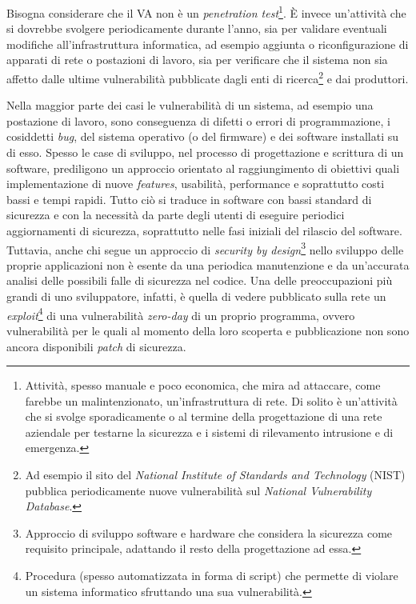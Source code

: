 \documentclass[target=bach,aauheader=]{thud}
\begin{document}
Bisogna considerare che il VA non è un \textit{penetration test}\footnote{Attività, spesso manuale e poco economica, che mira ad attaccare, come farebbe un malintenzionato, un’infrastruttura di rete. Di solito è un’attività che si svolge sporadicamente o al termine della progettazione di una rete aziendale per testarne la sicurezza e i sistemi di rilevamento intrusione e di emergenza.}. È invece un’attività che si dovrebbe svolgere periodicamente durante l’anno, sia per validare eventuali modifiche all’infrastruttura informatica, ad esempio aggiunta o riconfigurazione di apparati di rete o postazioni di lavoro, sia per verificare che il sistema non sia affetto dalle ultime vulnerabilità pubblicate dagli enti di ricerca\footnote{Ad esempio il sito del \textit{National Institute of Standards and Technology} (NIST) pubblica periodicamente nuove vulnerabilità sul \textit{National Vulnerability Database}.} e dai produttori.

Nella maggior parte dei casi le vulnerabilità di un sistema, ad esempio una postazione di lavoro, sono conseguenza di difetti o errori di programmazione, i cosiddetti \textit{bug}, del sistema operativo (o del firmware) e dei software installati su di esso. Spesso le case di sviluppo, nel processo di progettazione e scrittura di un software, prediligono un approccio orientato al raggiungimento di obiettivi quali implementazione di nuove \textit{features}, usabilità, performance e soprattutto costi bassi e tempi rapidi. Tutto ciò si traduce in software con bassi standard di sicurezza e con la necessità da parte degli utenti di eseguire periodici aggiornamenti di sicurezza, soprattutto nelle fasi iniziali del rilascio del software. Tuttavia, anche chi segue un approccio di \textit{security by design}\footnote{Approccio di sviluppo software e hardware che considera la sicurezza come requisito principale, adattando il resto della progettazione ad essa.} nello sviluppo delle proprie applicazioni non è esente da una periodica manutenzione e da un’accurata analisi delle possibili falle di sicurezza nel codice. Una delle preoccupazioni più grandi di uno sviluppatore, infatti, è quella di vedere pubblicato sulla rete un \textit{exploit}\footnote{Procedura (spesso automatizzata in forma di script) che permette di violare un sistema informatico sfruttando una sua vulnerabilità.} di una vulnerabilità \textit{zero-day} di un proprio programma, ovvero vulnerabilità per le quali al momento della loro scoperta e pubblicazione non sono ancora disponibili \textit{patch} di sicurezza.
\end{document}
